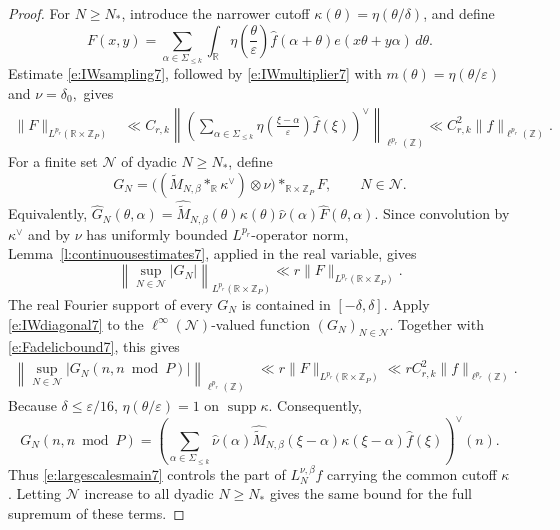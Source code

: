 \documentclass[12pt,reqno]{amsart}
\numberwithin{equation}{section}
\theoremstyle{definition}
\theoremstyle{remark}
\begin{document}
\begin{proof}
\medskip

For \(N\geq N_*\), introduce the narrower cutoff
\(\kappa(\theta)=\eta(\theta/\delta)\), and define
\[
 F(x,y)=
 \sum_{\alpha\in\Sigma_{\leq k}}
 \int_{\mathbb R}
 \eta\left(\frac{\theta}{\varepsilon}\right)
 \widehat f(\alpha+\theta)e(x\theta+y\alpha)\,d\theta.
\]
 Estimate  \eqref{e:IWsampling7}, followed by
\eqref{e:IWmultiplier7} with $m(\theta)=\eta(\theta/\varepsilon)$ and $\nu=\delta_0,$
gives
\begin{align}\label{e:Fadelicbound7}
 \|F\|_{L^{p_r}(\mathbb R\times\mathbb Z_P)}
 &\ll
 C_{r,k}
 \left\|
 \left(
 \sum_{\alpha\in\Sigma_{\leq k}}
 \eta\left(\frac{\xi-\alpha}{\varepsilon}\right)
 \widehat f(\xi)
 \right)^\vee
 \right\|_{\ell^{p_r}(\mathbb Z)}\ll
 C_{r,k}^2\|f\|_{\ell^{p_r}(\mathbb Z)}.
\end{align}
For a finite set \(\mathcal N\) of dyadic \(N\geq N_*\), define
\[
 G_N
 =
 \bigl(
   (\widetilde M_{N,\beta}*_{\mathbb R}\kappa^\vee)
   \otimes\nu
 \bigr)*_{\mathbb R\times\mathbb Z_P}F,
 \qquad N\in\mathcal N.
\]
Equivalently, $ \widehat G_N(\theta,\alpha)
 =
 \widehat{\widetilde M}_{N,\beta}(\theta)
 \kappa(\theta)\widehat\nu(\alpha)
 \widehat F(\theta,\alpha).$
Since convolution by \(\kappa^\vee\) and by \(\nu\) has uniformly
bounded \(L^{p_r}\)-operator norm, Lemma~\ref{l:continuousestimates7},
applied in the real variable, gives
\[
 \left\|
 \sup_{N\in\mathcal N}|G_N|
 \right\|_{L^{p_r}(\mathbb R\times\mathbb Z_P)}
 \ll
 r\|F\|_{L^{p_r}(\mathbb R\times\mathbb Z_P)}.
\]
The real Fourier support of every \(G_N\) is contained in
\([-\delta,\delta]\).
Apply \eqref{e:IWdiagonal7} to the
\(\ell^\infty(\mathcal N)\)-valued function
\((G_N)_{N\in\mathcal N}\).
Together with \eqref{e:Fadelicbound7}, this gives
\begin{align}\label{e:largescalesmain7}
 \left\|
 \sup_{N\in\mathcal N}
 |G_N(n,n\bmod P)|
 \right\|_{\ell^{p_r}(\mathbb Z)}
 &\ll
 r\|F\|_{L^{p_r}(\mathbb R\times\mathbb Z_P)}\ll
 rC_{r,k}^2\|f\|_{\ell^{p_r}(\mathbb Z)}.
\end{align}
Because \(\delta\leq\varepsilon/16\),
\(\eta(\theta/\varepsilon)=1\) on \(\operatorname{supp}\kappa\).
Consequently,
\[
 G_N(n,n\bmod P)
 =
 \left(
 \sum_{\alpha\in\Sigma_{\leq k}}
 \widehat\nu(\alpha)
 \widehat{\widetilde M}_{N,\beta}(\xi-\alpha)
 \kappa(\xi-\alpha)\widehat f(\xi)
 \right)^\vee(n).
\]
Thus \eqref{e:largescalesmain7} controls the part of
\(L_N^{\nu,\beta}f\) carrying the common cutoff \(\kappa\).  Letting
\(\mathcal N\) increase to all dyadic \(N\geq N_*\) gives the same
bound for the full supremum of these terms.


\end{proof}
\end{document}
